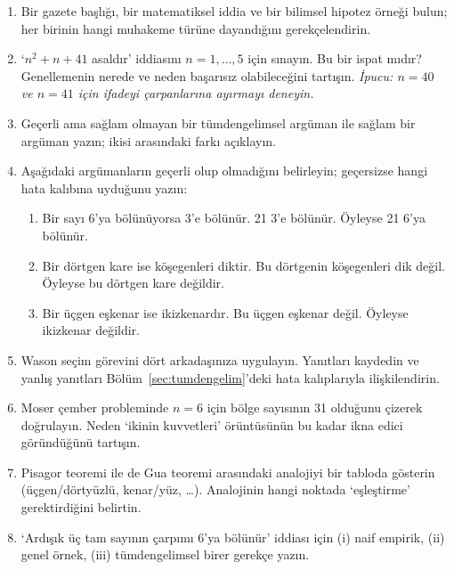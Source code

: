 \begin{enumerate}[leftmargin=1.8em,label=\textbf{\arabic*.}]
\item Bir gazete başlığı, bir matematiksel iddia ve bir bilimsel hipotez örneği bulun; her birinin hangi muhakeme türüne dayandığını gerekçelendirin.
\item ‘$n^2+n+41$ asaldır’ iddiasını $n=1,\dots,5$ için sınayın. Bu bir ispat mıdır? Genellemenin nerede ve neden başarısız olabileceğini tartışın. \emph{İpucu: $n=40$ ve $n=41$ için ifadeyi çarpanlarına ayırmayı deneyin.}
\item Geçerli ama sağlam olmayan bir tümdengelimsel argüman ile sağlam bir argüman yazın; ikisi arasındaki farkı açıklayın.
\item Aşağıdaki argümanların geçerli olup olmadığını belirleyin; geçersizse hangi hata kalıbına uyduğunu yazın:
\begin{enumerate}[label=(\alph*),leftmargin=1.4em]
\item Bir sayı 6’ya bölünüyorsa 3’e bölünür. 21 3’e bölünür. Öyleyse 21 6’ya bölünür.
\item Bir dörtgen kare ise köşegenleri diktir. Bu dörtgenin köşegenleri dik değil. Öyleyse bu dörtgen kare değildir.
\item Bir üçgen eşkenar ise ikizkenardır. Bu üçgen eşkenar değil. Öyleyse ikizkenar değildir.
\end{enumerate}
\item Wason seçim görevini dört arkadaşınıza uygulayın. Yanıtları kaydedin ve yanlış yanıtları Bölüm~\ref{sec:tumdengelim}’deki hata kalıplarıyla ilişkilendirin.
\item Moser çember probleminde $n=6$ için bölge sayısının 31 olduğunu çizerek doğrulayın. Neden ‘ikinin kuvvetleri’ örüntüsünün bu kadar ikna edici göründüğünü tartışın.
\item Pisagor teoremi ile de Gua teoremi arasındaki analojiyi bir tabloda gösterin (üçgen/dörtyüzlü, kenar/yüz, …). Analojinin hangi noktada ‘eşleştirme’ gerektirdiğini belirtin.
\item ‘Ardışık üç tam sayının çarpımı 6’ya bölünür’ iddiası için (i) naif empirik, (ii) genel örnek, (iii) tümdengelimsel birer gerekçe yazın.
\end{enumerate}


